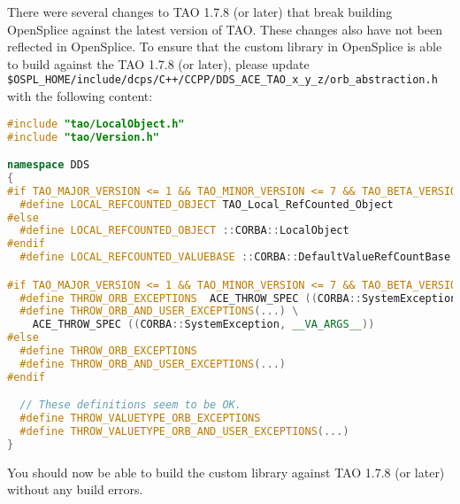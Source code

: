 There were several changes to TAO 1.7.8 (or later) that break
building OpenSplice against the latest version of TAO. These
changes also have not been reflected in OpenSplice. To ensure
that the custom library in OpenSplice is able to build against
the TAO 1.7.8 (or later), please update 
\texttt{\$OSPL\_HOME/include/dcps/C++/CCPP/DDS\_ACE\_TAO\_x\_y\_z/orb\_abstraction.h}
with the following content:
\begin{lstlisting}[language=C++]
#include "tao/LocalObject.h"
#include "tao/Version.h"

namespace DDS
{
#if TAO_MAJOR_VERSION <= 1 && TAO_MINOR_VERSION <= 7 && TAO_BETA_VERSION < 8
  #define LOCAL_REFCOUNTED_OBJECT TAO_Local_RefCounted_Object
#else
  #define LOCAL_REFCOUNTED_OBJECT ::CORBA::LocalObject
#endif
  #define LOCAL_REFCOUNTED_VALUEBASE ::CORBA::DefaultValueRefCountBase

#if TAO_MAJOR_VERSION <= 1 && TAO_MINOR_VERSION <= 7 && TAO_BETA_VERSION < 8
  #define THROW_ORB_EXCEPTIONS  ACE_THROW_SPEC ((CORBA::SystemException))
  #define THROW_ORB_AND_USER_EXCEPTIONS(...) \
    ACE_THROW_SPEC ((CORBA::SystemException, __VA_ARGS__))
#else
  #define THROW_ORB_EXCEPTIONS
  #define THROW_ORB_AND_USER_EXCEPTIONS(...)
#endif

  // These definitions seem to be OK.
  #define THROW_VALUETYPE_ORB_EXCEPTIONS
  #define THROW_VALUETYPE_ORB_AND_USER_EXCEPTIONS(...)
}
\end{lstlisting}
You should now be able to build the custom library against 
TAO 1.7.8 (or later) without any build errors.
